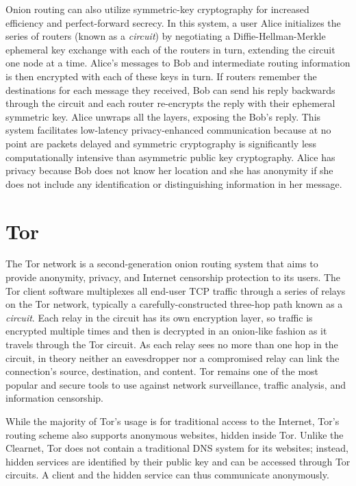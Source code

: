 Onion routing can also utilize symmetric-key cryptography for increased efficiency and perfect-forward secrecy. In this system, a user Alice initializes the series of routers (known as a \emph{circuit}) by negotiating a Diffie-Hellman-Merkle ephemeral key exchange with each of the routers in turn, extending the circuit one node at a time. Alice's messages to Bob and intermediate routing information is then encrypted with each of these keys in turn. If routers remember the destinations for each message they received, Bob can send his reply backwards through the circuit and each router re-encrypts the reply with their ephemeral symmetric key. Alice unwraps all the layers, exposing the Bob's reply. This system facilitates low-latency privacy-enhanced communication because at no point are packets delayed and symmetric cryptography is significantly less computationally intensive than asymmetric public key cryptography. Alice has privacy because Bob does not know her location and she has anonymity if she does not include any identification or distinguishing information in her message.\cite{syverson2011peel}\cite{dingledine2004tor}

\section{Tor}




The Tor network is a second-generation onion routing system that aims to provide anonymity, privacy, and Internet censorship protection to its users. The Tor client software multiplexes all end-user TCP traffic through a series of relays on the Tor network, typically a carefully-constructed three-hop path known as a \textit{circuit}. Each relay in the circuit has its own encryption layer, so traffic is encrypted multiple times and then is decrypted in an onion-like fashion as it travels through the Tor circuit. As each relay sees no more than one hop in the circuit, in theory neither an eavesdropper nor a compromised relay can link the connection's source, destination, and content. Tor remains one of the most popular and secure tools to use against network surveillance, traffic analysis, and information censorship.

While the majority of Tor's usage is for traditional access to the Internet, Tor's routing scheme also supports anonymous websites, hidden inside Tor. Unlike the Clearnet, Tor does not contain a traditional DNS system for its websites; instead, hidden services are identified by their public key and can be accessed through Tor circuits. A client and the hidden service can thus communicate anonymously.

